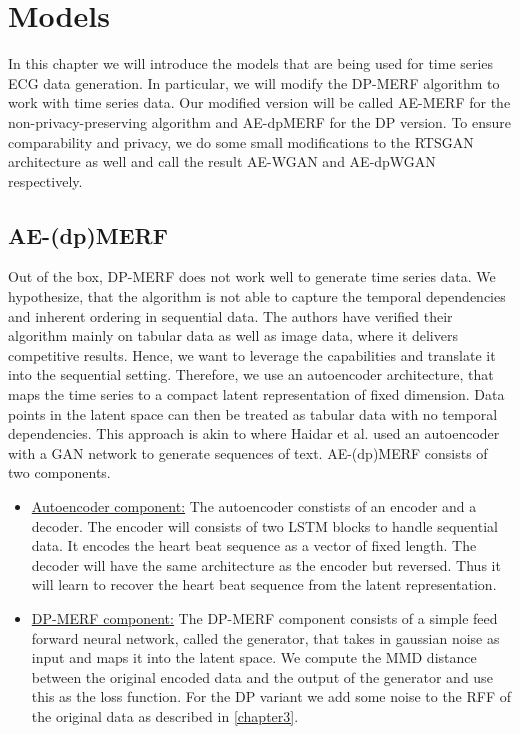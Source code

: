 \section{Models}\label{chapter4}
In this chapter we will introduce the models that are being used for time series ECG data generation. In particular, we will modify the DP-MERF algorithm to work with time series data. Our modified version will be called AE-MERF for the non-privacy-preserving algorithm and AE-dpMERF for the DP version. To ensure comparability and privacy, we do some small modifications to the RTSGAN architecture as well and call the result AE-WGAN and AE-dpWGAN respectively.

\subsection{AE-(dp)MERF}
Out of the box, DP-MERF does not work well to generate time series data. We hypothesize, that the algorithm is not able to capture the temporal dependencies and inherent ordering in sequential data. The authors have verified their algorithm mainly on tabular data as well as image data, where it delivers competitive results. Hence, we want to leverage the capabilities and translate it into the sequential setting. Therefore, we use an autoencoder architecture, that maps the time series to a compact latent representation of fixed dimension. Data points in the latent space can then be treated as tabular data with no temporal dependencies. This approach is akin to \parencite{gan_softtext} where Haidar et al. used an autoencoder with a GAN network to generate sequences of text. AE-(dp)MERF consists of two components.
\begin{itemize}
    \item \underline{Autoencoder component:} The autoencoder constists of an encoder and a decoder. The encoder will consists of two LSTM blocks to handle sequential data. It encodes the heart beat sequence as a vector of fixed length. The decoder will have the same architecture as the encoder but reversed. Thus it will learn to recover the heart beat sequence from the latent representation.
    \item \underline{DP-MERF component:} The DP-MERF component consists of a simple feed forward neural network, called the generator, that takes in gaussian noise as input and maps it into the latent space. We compute the MMD distance between the original encoded data and the output of the generator and use this as the loss function. For the DP variant we add some noise to the RFF of the original data as described in \cref{chapter3}.
\end{itemize}

